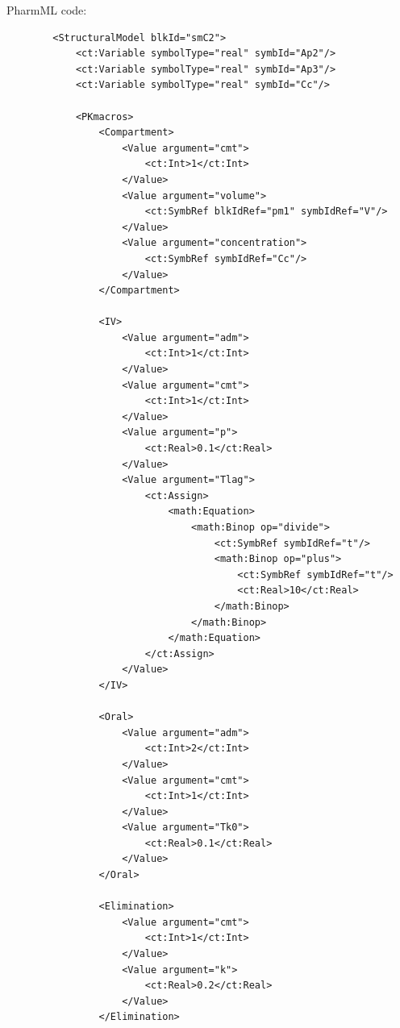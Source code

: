 PharmML code:
\lstset{language=XML}
\begin{lstlisting}
        <StructuralModel blkId="smC2">
            <ct:Variable symbolType="real" symbId="Ap2"/>
            <ct:Variable symbolType="real" symbId="Ap3"/>
            <ct:Variable symbolType="real" symbId="Cc"/>
            
            <PKmacros>
                <Compartment>
                    <Value argument="cmt">
                        <ct:Int>1</ct:Int>
                    </Value>
                    <Value argument="volume">
                        <ct:SymbRef blkIdRef="pm1" symbIdRef="V"/>
                    </Value>
                    <Value argument="concentration">
                        <ct:SymbRef symbIdRef="Cc"/>
                    </Value>
                </Compartment>
                
                <IV>
                    <Value argument="adm">
                        <ct:Int>1</ct:Int>
                    </Value>
                    <Value argument="cmt">
                        <ct:Int>1</ct:Int>
                    </Value>
                    <Value argument="p">
                        <ct:Real>0.1</ct:Real>
                    </Value>
                    <Value argument="Tlag">
                        <ct:Assign>
                            <math:Equation>
                                <math:Binop op="divide">
                                    <ct:SymbRef symbIdRef="t"/>
                                    <math:Binop op="plus">
                                        <ct:SymbRef symbIdRef="t"/>
                                        <ct:Real>10</ct:Real>
                                    </math:Binop>
                                </math:Binop>
                            </math:Equation>
                        </ct:Assign>
                    </Value>
                </IV>
                
                <Oral>
                    <Value argument="adm">
                        <ct:Int>2</ct:Int>
                    </Value>
                    <Value argument="cmt">
                        <ct:Int>1</ct:Int>
                    </Value>
                    <Value argument="Tk0">
                        <ct:Real>0.1</ct:Real>
                    </Value>
                </Oral>
                
                <Elimination>
                    <Value argument="cmt">
                        <ct:Int>1</ct:Int>
                    </Value>
                    <Value argument="k">
                        <ct:Real>0.2</ct:Real>
                    </Value>
                </Elimination>
                

\end{lstlisting}
